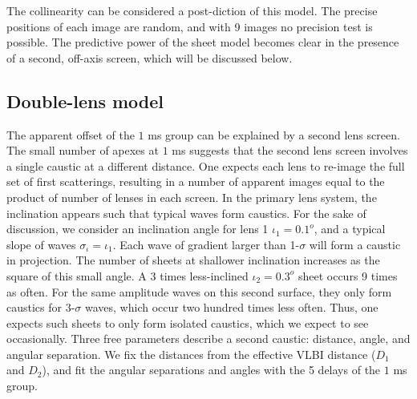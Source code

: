 \documentclass[useAMS,usenatbib]{mn2e}
\begin{document}
The collinearity can be considered a post-diction of this model.  The
precise positions of each image are random, and with 9 images no
precision test is possible.  The predictive power of the sheet model
becomes clear in the presence of a second, off-axis screen, which will be discussed below.



\subsection{Double-lens model}
\label{doublelensmodel}

The apparent offset of the $1$ ms group can be explained by a second lens
screen.  The small number of apexes at $1$ ms suggests that the second
lens screen involves a single caustic at a different distance.  One
expects each lens to re-image the full set of first scatterings,
resulting in a number of apparent images equal to the product of
number of lenses in each screen.
In the
primary lens system, the inclination appears such that typical waves
form caustics.  For the sake of discussion, we consider an inclination
angle for lens 1 $\iota_1 = 0.1^o$, and a typical slope of waves
$\sigma_\iota = \iota_1$.   Each wave of gradient larger than
1-$\sigma$ will form a caustic in projection. 
The number of sheets at shallower inclination
increases as the square of this small angle.  A 3 times less-inclined $\iota_2=0.3^o$
sheet occurs 9 times as often.  For the same amplitude waves on this
second surface, they only form
caustics for 3-$\sigma$ waves, which occur two hundred times less
often.  Thus, one expects such sheets to only form isolated caustics,
which we expect to see occasionally.  Three free parameters describe a
second caustic: distance, angle, and angular separation.  We fix the
distances from the effective VLBI distance ($D_1$ and $D_2$), and fit the angular
separations and angles with the 5 delays of the $1$ ms group.
\end{document}

